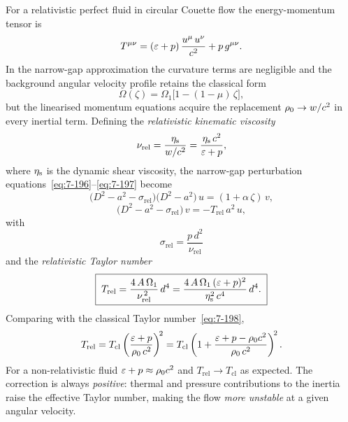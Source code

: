 For a relativistic perfect fluid in circular Couette flow the
energy-momentum tensor is
\begin{equation}
\label{eq:rel-7-191}
T^{\mu\nu} = (\varepsilon + p)\,\frac{u^{\mu}\,u^{\nu}}{c^{2}} + p\,g^{\mu\nu}.
\end{equation}
In the narrow-gap approximation the curvature terms are negligible
and the background angular velocity profile retains the classical form
\begin{equation}
\label{eq:rel-7-192}
\Omega(\zeta)
  = \Omega_{1}\bigl[1 - (1-\mu)\,\zeta\bigr],
\end{equation}
but the linearised momentum equations acquire the replacement
$\rho_0 \to w/c^{2}$ in every inertial term.
Defining the \emph{relativistic kinematic viscosity}
\begin{equation}
\label{eq:rel-7-193}
\nu_{\mathrm{rel}}
  = \frac{\eta_{\mathrm{s}}}{w/c^{2}}
  = \frac{\eta_{\mathrm{s}}\,c^{2}}{\varepsilon + p},
\end{equation}
where $\eta_{\mathrm{s}}$ is the dynamic shear viscosity, the narrow-gap
perturbation equations~\eqref{eq:7-196}--\eqref{eq:7-197} become
\begin{equation}
\label{eq:rel-7-196}
\bigl(D^{2} - a^{2} - \sigma_{\mathrm{rel}}\bigr)
\bigl(D^{2} - a^{2}\bigr)\,u
  = (1 + \alpha\,\zeta)\,v,
\end{equation}
\begin{equation}
\label{eq:rel-7-197}
\bigl(D^{2} - a^{2} - \sigma_{\mathrm{rel}}\bigr)\,v
  = -T_{\mathrm{rel}}\,a^{2}\,u,
\end{equation}
with
\begin{equation}
\label{eq:rel-7-198}
\sigma_{\mathrm{rel}} = \frac{p\,d^{2}}{\nu_{\mathrm{rel}}}
\end{equation}
and the \emph{relativistic Taylor number}
\begin{equation}
\label{eq:rel-7-199}
\boxed{\;
T_{\mathrm{rel}}
  = \frac{4\,A\,\Omega_{1}}{\nu_{\mathrm{rel}}^{\,2}}\,d^{4}
  = \frac{4\,A\,\Omega_{1}\,(\varepsilon+p)^{2}}
         {\eta_{\mathrm{s}}^{2}\,c^{4}}\,d^{4}.
\;}
\end{equation}
Comparing with the classical Taylor number~\eqref{eq:7-198},
\begin{equation}
\label{eq:rel-7-200}
T_{\mathrm{rel}}
  = T_{\mathrm{cl}}
    \left(\frac{\varepsilon + p}{\rho_0\,c^{2}}\right)^{\!2}
  = T_{\mathrm{cl}}
    \left(1 + \frac{\varepsilon + p - \rho_0 c^{2}}
                    {\rho_0\,c^{2}}\right)^{\!2}.
\end{equation}
For a non-relativistic fluid $\varepsilon + p \approx \rho_0 c^{2}$
and $T_{\mathrm{rel}} \to T_{\mathrm{cl}}$ as expected.  The
correction is always \emph{positive}: thermal and pressure
contributions to the inertia raise the effective Taylor number,
making the flow \emph{more unstable} at a given angular velocity.

